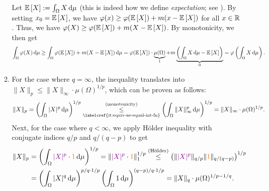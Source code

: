\begin{enumerate}
\begin{pf}
\begin{enumerate}
Let \(\expv{X}:=\int_{\Omega}^{}X\odif{\mu}\) (this is indeed how we define
\emph{expectation}; see ).  By setting
\(x_0=\mathbb{E}\left[X\right]\), we have \(\varphi(x)\ge \varphi(\mathbb{E}\left[X\right])+m(x-\mathbb{E}\left[X\right])\) for
all \(x\in\mathbb{R}\). Thus, we have \(\varphi(X)\ge
\varphi(\mathbb{E}\left[X\right])+m(X-\mathbb{E}\left[X\right])\). By monotonicity, we then get
\[
\int_{\Omega}^{}\varphi(X)\odif{\mu}\ge \int_{\Omega}^{}\varphi(\expv{X})
+m(X-\expv{X})\odif{\mu}
=\varphi(\expv{X})\cdot \underbrace{\mu(\Omega)}_{1}
+m\underbrace{\left(\int_{\Omega}^{}X\odif{\mu}-\expv{X}\right)}_{0}
=\varphi\left(\int_{\Omega}^{}X\odif{\mu}\right).
\]
\item For the case where \(q=\infty\), the inequality
translates into \(\|X\|_{p}\le\|X\|_{\infty}\cdot \mu(\Omega)^{1/p}\), which can
be proven as follows:
\[
\|X\|_{p}=\left(\int_{\Omega}^{}|X|^{p}\odif{\mu}\right)^{1/p}
\underset{\text{\labelcref{it:equiv-ae-equal-int-fn}}}{\overset{\text{(monotonicity)}}{\le}}
\left(\int_{\Omega}^{}\|X\|_{\infty}^{p}\odif{\mu}\right)^{1/p}
=\|X\|_{\infty}\cdot \mu(\Omega)^{1/p}.
\]
Next, for the case where \(q<\infty\), we apply H\"older inequality with
conjugate indices \(q/p\) and \(q/(q-p)\) to get
\begin{align*}
\|X\|_{p}&=\left(\int_{\Omega}^{}\vc{|X|^{p}}\cdot \orc{1}\odif{\mu}\right)^{1/p}
=\|\vc{|X|^{p}}\cdot \orc{1}\|_{1}^{1/p}
\overset{\text{(H\"older)}}{\le}
\left(\|\vc{|X|^{p}}\|_{q/p}\|\orc{1}\|_{q/(q-p)}\right)^{1/p} \\
&=\left(\int_{\Omega}^{}|X|^{q}\odif{\mu}\right)^{p/q\cdot 1/p}
\left(\int_{\Omega}^{}1\odif{\mu}\right)^{(q-p)/q\cdot 1/p}
=\|X\|_{q}\cdot \mu(\Omega)^{1/p-1/q}.
\end{align*}
\end{enumerate}
\end{pf}
\end{enumerate}
